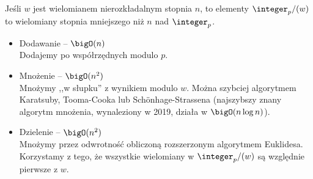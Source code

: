 Jeśli \( w \) jest wielomianem nierozkładalnym stopnia \( n \), to elementy \( \integer_p/(w) \) to wielomiany stopnia mniejszego niż \( n \) nad \( \integer_p \).
\begin{itemize}
	\item Dodawanie -- \( \bigO(n) \) \\
	      Dodajemy po współrzędnych modulo \( p \).
	\item Mnożenie -- \( \bigO(n^2) \) \\
	      Mnożymy ,,w słupku'' z wynikiem modulo \( w \). Można szybciej algorytmem Karatsuby, Tooma-Cooka lub Sch\"onhage-Strassena (najszybszy znany algorytm mnożenia, wynaleziony w 2019, działa w \( \bigO(n\log n) \)).
	\item Dzielenie -- \( \bigO(n^2) \) \\
	      Mnożymy przez odwrotność obliczoną rozszerzonym algorytmem Euklidesa. Korzystamy z tego, że wszystkie wielomiany w \( \integer_p/(w) \) są względnie pierwsze z \( w \).
\end{itemize}
